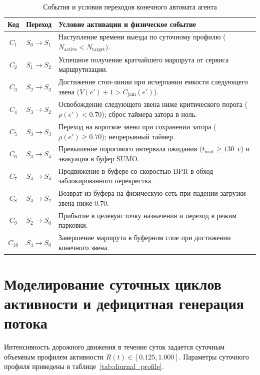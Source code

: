 \begin{table}[h!]
\centering
\caption{События и условия переходов конечного автомата агента}
\label{tab:agent_transitions}
\small
\begin{tabularx}{\textwidth}{|c|c|L|}
\hline
\textbf{Код} & \textbf{Переход} & \textbf{Условие активации и физическое событие} \\ \hline
$C_1$ & $S_0 \to S_1$ & Наступление времени выезда по суточному профилю ($N_{\text{active}} < N_{\text{target}}$). \\ \hline
$C_2$ & $S_1 \to S_2$ & Успешное получение кратчайшего маршрута от сервиса маршрутизации. \\ \hline
$C_3$ & $S_2 \to S_3$ & Достижение стоп-линии при исчерпании емкости следующего звена ($V(e') + 1 > C_{\text{jam}}(e')$). \\ \hline
$C_4$ & $S_3 \to S_2$ & Освобождение следующего звена ниже критического порога ($\rho(e') < 0.70$); сброс таймера затора в ноль. \\ \hline
$C_5$ & $S_3 \to S_3$ & Переход на короткое звено при сохранении затора ($\rho(e') \ge 0.70$); непрерывный таймер. \\ \hline
$C_6$ & $S_3 \to S_4$ & Превышение порогового интервала ожидания ($t_{\text{wait}} \ge 130$~с) и эвакуация в буфер SUMO. \\ \hline
$C_7$ & $S_4 \to S_4$ & Продвижение в буфере со скоростью BPR в обход заблокированного перекрестка. \\ \hline
$C_8$ & $S_4 \to S_2$ & Возврат из буфера на физическую сеть при падении загрузки звена ниже $0.70$. \\ \hline
$C_9$ & $S_2 \to S_0$ & Прибытие в целевую точку назначения и переход в режим парковки. \\ \hline
$C_{10}$ & $S_4 \to S_0$ & Завершение маршрута в буферном слое при достижении конечного звена. \\ \hline
\end{tabularx}
\end{table}

\section{Моделирование суточных циклов активности и дефицитная генерация потока}
\label{sec:diurnal_control}

Интенсивность дорожного движения в течение суток задается суточным объемным профилем активности $R(t) \in [0.125, 1.000]$. Параметры суточного профиля приведены в таблице~\ref{tab:diurnal_profile}.

